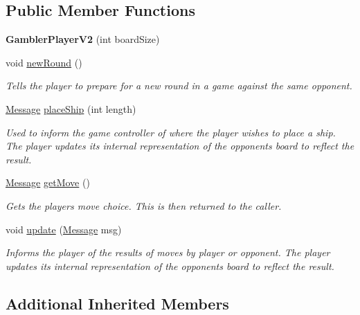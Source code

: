 \subsection*{Public Member Functions}
\begin{DoxyCompactItemize}
\item 
{\bfseries Gambler\+Player\+V2} (int board\+Size)\hypertarget{classGamblerPlayerV2_a07e006838de5339411a54116629eaf46}{}\label{classGamblerPlayerV2_a07e006838de5339411a54116629eaf46}

\item 
void \hyperlink{classGamblerPlayerV2_a349eb04948fd19a3e91fa5b2b427aac5}{new\+Round} ()
\begin{DoxyCompactList}\small\item\em Tells the player to prepare for a new round in a game against the same opponent. \end{DoxyCompactList}\item 
\hyperlink{classMessage}{Message} \hyperlink{classGamblerPlayerV2_aa0031a909f0cf326e7ec3ffcec20c88e}{place\+Ship} (int length)
\begin{DoxyCompactList}\small\item\em Used to inform the game controller of where the player wishes to place a ship. The player updates its internal representation of the opponent\textquotesingle{}s board to reflect the result. \end{DoxyCompactList}\item 
\hyperlink{classMessage}{Message} \hyperlink{classGamblerPlayerV2_a87884e743f5f88bf48372c7e24f01582}{get\+Move} ()
\begin{DoxyCompactList}\small\item\em Gets the player\textquotesingle{}s move choice. This is then returned to the caller. \end{DoxyCompactList}\item 
void \hyperlink{classGamblerPlayerV2_a2d46df35dd7fc5ded8502040b15f9209}{update} (\hyperlink{classMessage}{Message} msg)
\begin{DoxyCompactList}\small\item\em Informs the player of the results of move\textquotesingle{}s by player or opponent. The player updates its internal representation of the opponent\textquotesingle{}s board to reflect the result. \end{DoxyCompactList}\end{DoxyCompactItemize}
\subsection*{Additional Inherited Members}


